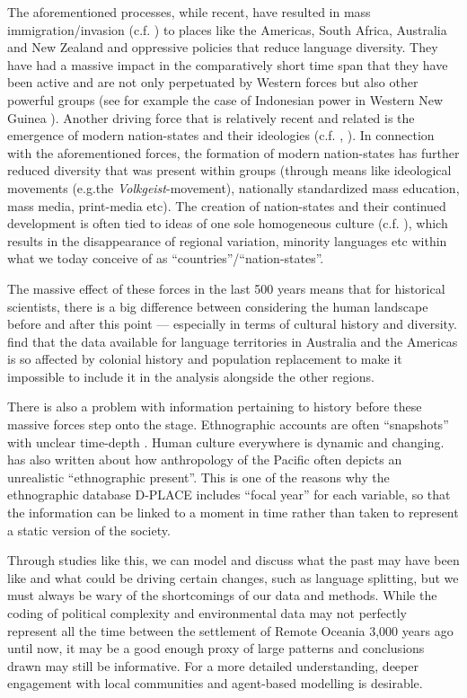 \documentclass[unnumsec,webpdf,modern,medium]{oup-authoring-template}
\begin{document}
The aforementioned processes, while recent, have resulted in mass immigration/invasion (c.f. \citet{invasion_day}) to places like the Americas, South Africa, Australia and New Zealand and oppressive policies that reduce language diversity. They have had a massive impact in the comparatively short time span that they have been active and are not only perpetuated by Western forces but also other powerful groups (see for example the case of Indonesian power in Western New Guinea \citep{gietzelt1989indonesianization}). Another driving force that is relatively recent and related is the emergence of modern nation-states and their ideologies (c.f. \citet{foucault2007security}, \citet[21-22]{oakes2001language}). In connection with the aforementioned forces, the formation of modern nation-states has further reduced diversity that was present within groups (through means like ideological movements (e.g.the \emph{Volkgeist}-movement), nationally standardized mass education, mass media, print-media etc). The creation of nation-states and their continued development is often tied to ideas of one sole homogeneous culture (c.f. \citet{encyclo_nationalism}), which results in the disappearance of regional variation, minority languages etc within what we today conceive of as ``countries''/``nation-states''. 

The massive effect of these forces in the last 500 years means that for historical scientists, there is a big difference between considering the human landscape before and after this point --- especially in terms of cultural history and diversity. \citet[7340-7341]{curriemace2009} find that the data available for language territories in Australia and the Americas is so affected by colonial history and population replacement to make it impossible to include it in the analysis alongside the other regions. 

There is also a problem with information pertaining to history before these massive forces step onto the stage. Ethnographic accounts are often ``snapshots'' with unclear time-depth \citep[113]{bedford2008northern}. Human culture everywhere is dynamic and changing. \citet{meleisea1995} has also written about how anthropology of the Pacific often depicts an unrealistic ``ethnographic present''. This is one of the reasons why the ethnographic database D-PLACE \citep{d_place_all} includes ``focal year'' for each variable, so that the information can be linked to a moment in time rather than taken to represent a static version of the society.

Through studies like this, we can model and discuss what the past may have been like and what could be driving certain changes, such as language splitting, but we must always be wary of the shortcomings of our data and methods. While the coding of political complexity and environmental data may not perfectly represent all the time between the settlement of Remote Oceania 3,000 years ago until now, it may be a good enough proxy of large patterns and conclusions drawn may still be informative. For a more detailed understanding, deeper engagement with local communities and agent-based modelling is desirable.
\newpage
\end{document}

